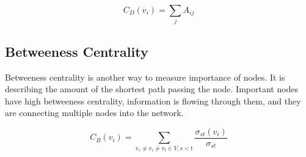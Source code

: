 \begin{equation*}\label{eq:degree-centrality}
C_{D}(v_{i})={\sum}_{j}A_{ij} \tag{2}
\end{equation*}

\subsection{Betweeness Centrality}

Betweeness centrality is another way to measure importance of nodes.
It is describing the amount of the shortest path passing the node.
Important nodes have high betweeness centrality, information is flowing through them, and they are connecting multiple nodes into the network.

\begin{equation*}
    C_{B}(v_{i})={\sum}_{v_{s}\neq v_{i}\neq v_{t}\in V,s < \text{t}}\frac{\sigma_{st}(v_{i})}{\sigma_{st}} \tag{3}
\end{equation*}

